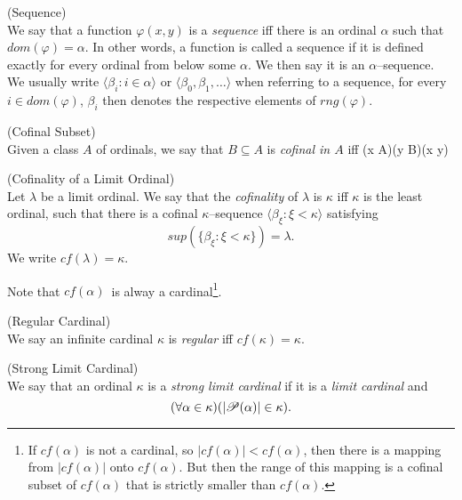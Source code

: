 \begin{definition}{(Sequence)}\label{def:sequence}\\
We say that a function $\varphi(x, y)$ is a \emph{sequence} iff there is an ordinal $\alpha$ such that $dom(\varphi) = \alpha$. In other words, a function is called a sequence if it is defined exactly for every ordinal from below some $\alpha$. We then say it is an $\alpha$–sequence. We usually write $\langle \beta_i : i \in \alpha \rangle$ or $\langle \beta_0, \beta_1, \ldots \rangle$ when referring to a sequence, for every $i \in dom(\varphi)$, $\beta_i$ then denotes the respective elements of $rng(\varphi)$.
\end{definition}

\begin{definition}{(Cofinal Subset)}\label{def:cofinal_subset}\\
Given a class $A$ of ordinals, we say that $B \subseteq A$ is \emph{cofinal in $A$} iff
\beq
(\forall x \in A)(\exists y \in B)(x \in y)
\eeq
\end{definition}

\begin{definition}{(Cofinality of a Limit Ordinal)}\label{def:cofinality}\\ %
Let $\lambda$ be a limit ordinal. 
We say that the \emph{cofinality} of $\lambda$ is $\kappa$ iff $\kappa$ is the least ordinal, such that there is a cofinal $\kappa$–sequence $\langle \beta_\xi : \xi < \kappa \rangle$ satisfying
\begin{equation}
sup(\{\beta_\xi: \xi < \kappa\}) = \lambda\mbox{.}
\end{equation}
We write $cf(\lambda) = \kappa$.
\end{definition}
Note that $cf(\alpha)$ is alway a cardinal\footnote{If $cf(\alpha)$ is not a cardinal, so $|cf(\alpha)| < cf(\alpha)$, then there is a mapping from $|cf(\alpha)|$ onto $cf(\alpha)$. But then the range of this mapping is a cofinal subset of $cf(\alpha)$ that is strictly smaller than $cf(\alpha)$.}.

\begin{definition}{(Regular Cardinal)}\label{def:regular_cardinal}\\
We say an infinite cardinal $\kappa$ is \emph{regular} iff $cf(\kappa) = \kappa$. %
\end{definition}

\begin{definition}{(Strong Limit Cardinal)}\label{def:strong_limit_cardinal}\\
We say that an ordinal $\kappa$ is a \emph{strong limit cardinal} if it is a \emph{limit cardinal} and 
\begin{equation}
(\forall \alpha \in \kappa)(|\mathscr{P} (\alpha)| \in \kappa)\mbox{.}
\end{equation}
\end{definition}

